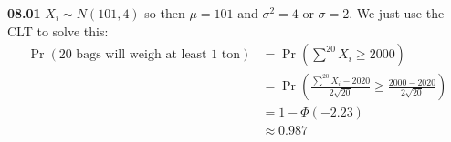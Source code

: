 {\bf 08.01} \quad $X_{i} \sim N(101,4)$ so then $\mu = 101$ and $\sigma^2 = 4$ or $\sigma = 2$. We just use the CLT to
solve this: \\
\begin{align*}
	\Pr \left( \text{20 bags will weigh at least 1 ton} \right) & = \Pr \left( \sum^{20} X_{i} \geq 2000 \right) \\
	& = \Pr \left( \frac{\sum^{20} X_{i} - 2020}{2 \sqrt{20} } \geq \frac{2000 -2020}{2 \sqrt{20} } \right) \\
	& = 1 - \Phi \left( -2.23 \right) \\
	& \approx 0.987 \\
\end{align*}
\\
